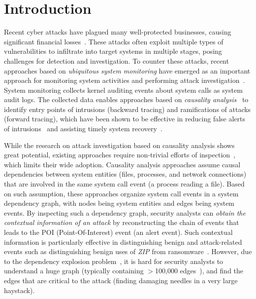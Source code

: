 \section{Introduction}
\label{sec:intro}


Recent cyber attacks have plagued many well-protected businesses, causing significant 
financial losses~\cite{ebay,opm,target,homedepot,ya:yahooleak,equifax,marriott}.
These attacks often exploit multiple types of vulnerabilities to infiltrate into target systems in multiple stages, posing challenges for detection and investigation.
To counter these attacks, recent approaches based on \emph{ubiquitous system monitoring} have emerged as an important approach for monitoring system activities and performing attack investigation~\cite{backtracking,backtracking2,wormlog,logtracking,mcitracking,liu2018priotracker,gao2018aiql,gao2018saql}.
System monitoring collects kernel auditing events about system calls as system audit logs.
The collected data enables approaches based on \textit{causality analysis}~\cite{backtracking,backtracking2,taser,intrusionrecovery,liu2018priotracker,mcitracking,hassan2019nodoze,ma2016protracer} to identify entry points of intrusions (backward tracing) and ramifications of attacks (forward tracing), 
which have been shown to be effective in reducing false alerts of intrusions~\cite{alertfp,alertfp2,hassan2019nodoze} and assisting timely system recovery~\cite{taser,intrusionrecovery}.

While the research on attack investigation based on causality analysis shows great potential, 
existing approaches require non-trivial efforts of inspection~\cite{auditcluster,hassan2019nodoze}, which limits their wide adoption.
Causality analysis approaches assume causal dependencies between system entities (\eg files, processes, and network connections) that are involved in the same system call event (\eg a process reading a file).
Based on such assumption, these approaches organize system call events in a system dependency graph, with nodes being system entities and edges being system events.
By inspecting such a dependency graph, security analysts can \textit{obtain the contextual information of an attack} by reconstructing the chain of events that leads to the POI (Point-Of-Interest) event (\eg an alert event).
Such contextual information is particularly effective in distinguishing benign and attack-related events such as distinguishing benign uses of \textit{ZIP} from ransomware~\cite{hassan2019nodoze,ransomware}.
However, due to the dependency explosion problem~\cite{beep,reduction,reduction2}, it is 
hard for security analysts to understand a huge graph (typically containing $>$100,000 edges~\cite{hassan2019nodoze,auditcluster}), and find the edges that are critical to the attack (\ie finding damaging needles in a very large haystack).


